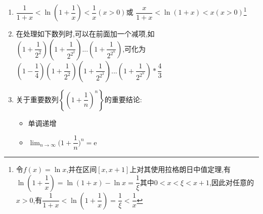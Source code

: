 \documentclass[8pt a4paper, oneside, UTF8]{ctexbook}
\begin{document}
\begin{sloppypar}
\begin{itemize}
\begin{enumerate}
            \item $\dfrac{1}{1+x}<\ln(1+\dfrac{1}{x})<\dfrac{1}{x}(x>0)$或 $\dfrac{x}{1+x}<\ln(1+x)<x(x>0)$\footnote{
                令$f(x)=\ln x$,并在区间$[x,x+1]$上对其使用拉格朗日中值定理,有$\ln\left(1+\dfrac{1}{x}\right)=\ln(1+x)-\ln x=\dfrac{1}{\xi}$其中$0<x<\xi<x+1$,因此对任意的$x>0$,有$\dfrac{1}{1+x}<\ln\left(1+\dfrac{1}{x}\right)=\dfrac{1}{\xi}<\dfrac{1}{x}$}
            \item 在处理如下数列时,可以在前面加一个减项,如$(1+\dfrac{1}{2^2})(1+\dfrac{1}{2^{2^2}})...(1+\dfrac{1}{2^{2^n}})$,可化为$(1-\dfrac{1}{4})(1+\dfrac{1}{2^2})(1+\dfrac{1}{2^{2^2}})...(1+\dfrac{1}{2^{2^n}})*\dfrac{4}{3}$
            \item 关于重要数列$\left\{\left(1+\dfrac{1}{n}\right)^{n}\right\}$的重要结论:
                \begin{itemize}
                    \item 单调递增
                    \item $\lim_{n\to\infty}\biggl(1+\dfrac{1}{n}\biggr)^{n}=\mathrm{e}$
                \end{itemize}
        \end{enumerate}
    \end{itemize}

\end{sloppypar}
\end{document}
